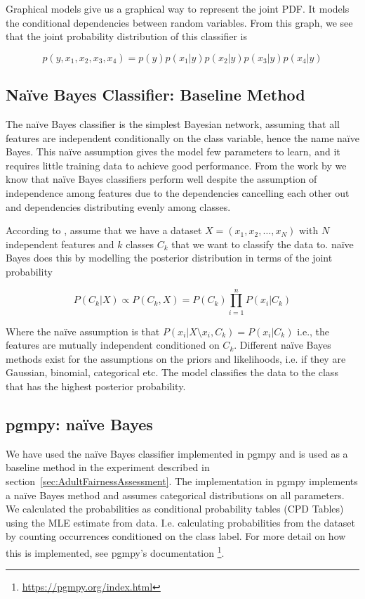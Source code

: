 Graphical models give us a graphical way to represent the joint PDF. It models the conditional dependencies between random variables. From this graph, we see that the joint probability distribution of this classifier is

\begin{equation*}
    p(y, x_1, x_2, x_3, x_4) = p(y)p(x_1|y)p(x_2|y)p(x_3|y)p(x_4|y)
\end{equation*}

\subsection{Naïve Bayes Classifier: Baseline Method}
\label{relatedwork:naïveBayes}
The naïve Bayes classifier is the simplest Bayesian network, assuming that all features are independent conditionally on the class variable, hence the name naïve Bayes. This naïve assumption gives the model few parameters to learn, and it requires little training data to achieve good performance. From the work by \citet{Zhang:2004:AAAI} we know that naïve Bayes classifiers perform well despite the assumption of independence among features due to the dependencies cancelling each other out and dependencies distributing evenly among classes.

According to \citet[p.~217]{Ankan:2015:Book}, assume that we have a dataset $X = (x_1, x_2, \dots, x_N)$ with $N$ independent features and $k$ classes $C_k$ that we want to classify the data to. naïve Bayes does this by modelling the posterior distribution in terms of the joint probability

$$
P(C_k | X) \propto P(C_k , X) = P(C_k) \prod_{i=1}^{n} P(x_i|C_k)
$$

Where the naïve assumption is that $P(x_i | X \setminus x_i , C_k) = P(x_i | C_k)$ i.e., the features are mutually independent conditioned on $C_k$. Different naïve Bayes methods exist for the assumptions on the priors and likelihoods, i.e. if they are Gaussian, binomial, categorical etc. The model classifies the data to the class that has the highest posterior probability. 

\subsection{pgmpy: naïve Bayes}

We have used the naïve Bayes classifier implemented in pgmpy and is used as a baseline method in the experiment described in section~\ref{sec:AdultFairnessAssessment}. The implementation in pgmpy implements a naïve Bayes method and assumes categorical distributions on all parameters. We calculated the probabilities as conditional probability tables (CPD Tables) using the MLE estimate from data. I.e. calculating probabilities from the dataset by counting occurrences conditioned on the class label. For more detail on how this is implemented, see pgmpy's documentation \footnote{\url{https://pgmpy.org/index.html}}.

